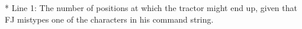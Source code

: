 * Line 1: The number of positions at which the tractor might end up,         given that FJ mistypes one of the characters in his command         string.